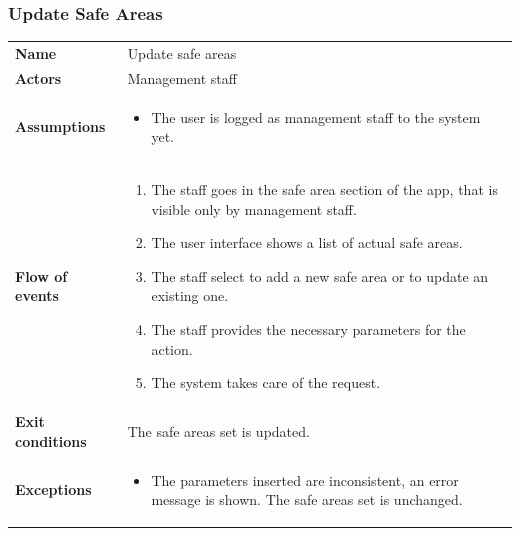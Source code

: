 \documentclass[english]{article}
\begin{document}
		\subsubsection{Update Safe Areas}
		\begin{center}
		\begin{tabular}{l||p{10cm}}
		\textbf{Name} 
			& Update safe areas\\ [8px]
		\textbf{Actors} 
			& Management staff\\ [8px]
		\textbf{Assumptions} 
			& \begin{itemize}
				\item The user is logged as management staff to the system yet.
			\end{itemize}\\
		\textbf{Flow of events}
			& \begin{enumerate}
	 			\item The staff goes in the safe area section of the app, that is visible only by management staff.
				\item The user interface shows a list of actual safe areas.
				\item The staff select to add a new safe area or to update an existing one.
				\item The staff provides the necessary parameters for the action.
				\item The system takes care of the request.
			\end{enumerate}\\ 
		\textbf{Exit conditions}
			& The safe areas set is updated.\\ [8px]
		\textbf{Exceptions}
			& \begin{itemize}
				\item The parameters inserted are inconsistent, an error message is shown. The safe areas set is unchanged.
			\end{itemize}
		\end{tabular}
		\end{center}
		\vspace*{\fill}
		\noindent
\end{document}
